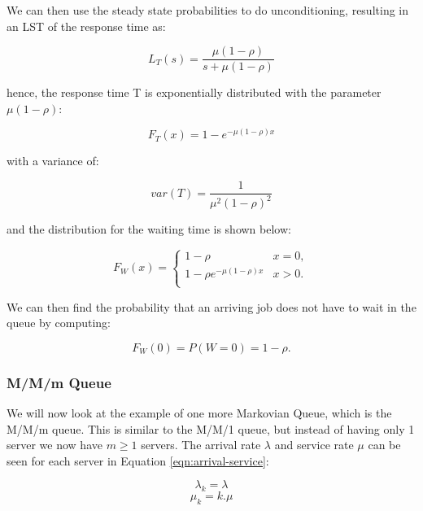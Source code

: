 \documentclass[a4paper,11pt,titlepage]{article}
\begin{document}
We can then use the steady state probabilities to do unconditioning, resulting in an LST of the response time as: 

\begin{equation}
    L_T(s) = \frac{\mu (1 - \rho)}{s + \mu (1 - \rho)}
\end{equation}

hence, the response time T is exponentially distributed with the parameter $\mu (1 - \rho)$:

\begin{equation}
    F_T(x) = 1 - e^{-\mu (1 - \rho) x}
\end{equation}

with a variance of:

\begin{equation}
    var(T) = \frac{1}{\mu^2 (1 - \rho)^2}
\end{equation}

and the distribution for the waiting time is shown below: 

\begin{equation}
F_W(x) = 
    \begin{cases}
    1-\rho & x = 0, \\
    1 - \rho e^{-\mu (1-\rho) x} & x > 0. \\
    \end{cases}
\end{equation}

We can then find the probability that an arriving job does not have to wait in the queue by computing:

\begin{equation}
    F_W(0) = P(W = 0) = 1 - \rho.
\end{equation}

\subsubsection{M/M/m Queue}

We will now look at the example of one more Markovian Queue, which is the M/M/m queue. This is similar to the M/M/1 queue, but instead of having only 1 server we now have $m \geq 1$ servers. The arrival rate $\lambda$ and service rate $\mu$ can be seen for each server in Equation \ref{eqn:arrival-service}: 

\begin{equation}
    \label{eqn:arrival-service}
    \lambda_k = \lambda
\end{equation}
$$ \mu_k = k . \mu $$ 
\end{document}
